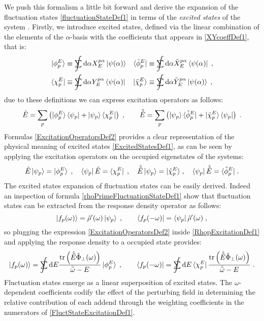 \documentclass[a4paper]{article}
\newcommand{\dd}{{\rm d}}
\newcommand{\bomega}{\bar\omega}
\newcommand{\bbomega}{\bar{\bomega}}
\newcommand{\sint}{\mathrlap{\displaystyle\int}
\mathrlap{\textstyle\sum}
\phantom{\mathrlap{\displaystyle
\int}\textstyle\sum}}
\newcommand{\be}{\begin{equation}}
\newcommand{\ee}{\end{equation}}
\newcommand{\nn}{\notag}
\newcommand{\qq}{\qquad}
\newcommand{\lb}{\label}
\newcommand{\op}[1]{\hat {#1}}
\newcommand{\trace}[1]{\mathrm{tr}\left(#1\right)}
\newcommand{\opskew}[1]{{\op {#1}}_{\perp}}
\newcommand{\tket}[1]{| \tilde #1 \rangle}
\newcommand{\tbra}[1]{\langle \tilde #1 |}
\newcommand{\dm}{\op{\rho}}
\begin{document}
We push this formalism a little bit forward and derive the expansion of the fluctuation states \eqref{fluctuationStateDef1} in terms of the \emph{excited states} of the 
system . Firstly, we introduce excited states, defined via the linear combination of the elements of the $\alpha$-basis with the coefficients that appears in 
\eqref{XYcoeffDef1}, that is:
\begin{align}\lb{ExcitedStatesDef1}
\ket{\phi^E_p} &\equiv \sint \dd \alpha X_{E}^{p \alpha} \ket{\psi(\alpha)} &
\tbra{\phi^E_p} &\equiv \sint \dd \alpha {\tilde X_{E}^{p \alpha}} \bra{\psi(\alpha)} \;, \nn\\
\bra{\chi^E_p} &\equiv \sint \dd \alpha  Y_{E}^{p \alpha} \bra{\psi(\alpha)} &
\tket{\chi^E_p} &\equiv \sint \dd \alpha {\tilde Y}_{E}^{p\alpha} \ket{\psi(\alpha)} \;,
\end{align}
due to these definitions we can express excitation operators as follows:
\be\lb{ExcitationOperatorsDef2}
\op E = \sum_p \left( \ket{\phi^E_p}\bra{\psi_p} + \ket{\psi_p} \bra{\chi^E_p}\right)\;, \qq
\op {\tilde E} = \sum_p \left( \ket{\psi_p} \tbra{\phi^E_p} + \tket{\chi^E_p}\bra{\psi_p} \right)\;.
\ee
Formulas \eqref{ExcitationOperatorsDef2} provides a clear representation of the physical meaning of excited states \eqref{ExcitedStatesDef1}, as can be seen by applying
the excitation operators on the occupied eigenstates of the systems:
\be
\op E\ket{\psi_p} = \ket{\phi^E_p} \;, \quad \bra{\psi_p} \op E = \bra{\chi^E_p} \;, \quad
\op {\tilde E}\ket{\psi_p} = \tket{\chi^E_p} \;, \quad \bra{\psi_p} \op {\tilde E} = \tbra{\phi^E_p} \;.
\nn
\ee
The excited states expansion of fluctuation states can be easily derived.  Indeed an inspection of formula \eqref{rhoPrimeFluctuationStateDef1} show that fluctuation 
states can be extracted from the response density operator as follows:
\be
\ket{f_p(\omega)} = \dm'(\omega)\ket{\psi_p} \;, \qq
\bra{f_p(-\omega)} = \bra{\psi_p}\dm'(\omega) \;, \nn
\ee
so plugging the expression \eqref{ExcitationOperatorsDef2} inside \eqref{RhopExcitationDef1} and applying the response density to a occupied state provides:
\be\lb{FluctStateExcitationDef1}
\ket{f_p(\omega)} = \sint\dd E \frac{\trace{\op{\tilde E}\opskew{\Phi}(\omega)}}{\bbomega-E} \ket{\phi^E_p} \;, \qq
\bra{f_p(-\omega)} = \sint\dd E \bra{\chi^E_p}\frac{\trace{\op{\tilde E}\opskew{\Phi}(\omega)}}{\bbomega-E} \;.
\ee
Fluctuation states emerge as a linear superposition of excited states. The $\omega$-dependent coefficients codify the effect of the perturbing field in determining the 
relative contribution of each addend through the weighting coefficients in the numerators of \eqref{FluctStateExcitationDef1}.  
\end{document}

